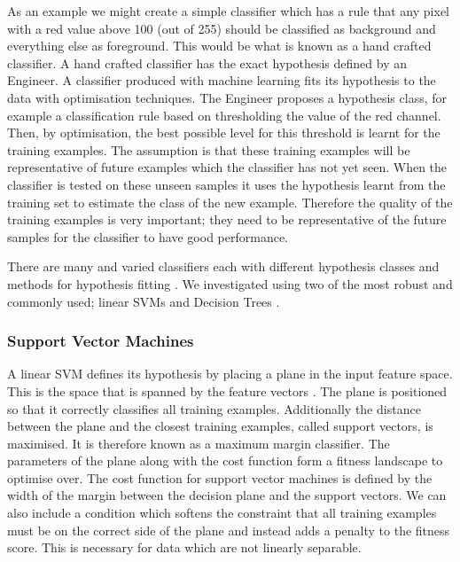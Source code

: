 \documentclass[12pt]{IIBproject}
\begin{document}
 As an example we might create a simple classifier which has a rule that any pixel with a red value above 100 (out of 255) should be classified as background and everything else as foreground. This would be what is known as a hand crafted classifier. A hand crafted classifier has the exact hypothesis defined by an Engineer. A classifier produced with machine learning fits its hypothesis to the data with optimisation techniques. The Engineer proposes a hypothesis class, for example a classification rule based on thresholding the value of the red channel. Then, by optimisation, the best possible level for this threshold is learnt for the training examples. The assumption is that these training examples will be representative of future examples which the classifier has not yet seen. When the classifier is tested on these unseen samples it uses the hypothesis learnt from the training set to estimate the class of the new example. Therefore the quality of the training examples is very important; they need to be representative of the future samples for the classifier to have good performance.
 
 There are many and varied classifiers each with different hypothesis classes and methods for hypothesis fitting . We investigated using two of the most robust and commonly used; linear SVMs and Decision Trees \cite{quinlan1986induction}. 
 
\subsubsection{Support Vector Machines}
A linear SVM defines its hypothesis by placing a plane in the input feature space. This is the space that is spanned by the feature vectors \cite{suykens1999least}. The plane is positioned so that it correctly classifies all training examples. Additionally the distance between the plane and the closest training examples, called support vectors, is maximised. It is therefore known as a maximum margin classifier. The parameters of the plane along with the cost function form a fitness landscape to optimise over. The cost function for support vector machines is defined by the width of the margin between the decision plane and the support vectors. We can also include a condition which softens the constraint that all training examples must be on the correct side of the plane and instead adds a penalty to the fitness score. This is necessary for data which are not linearly separable. 
\end{document}
